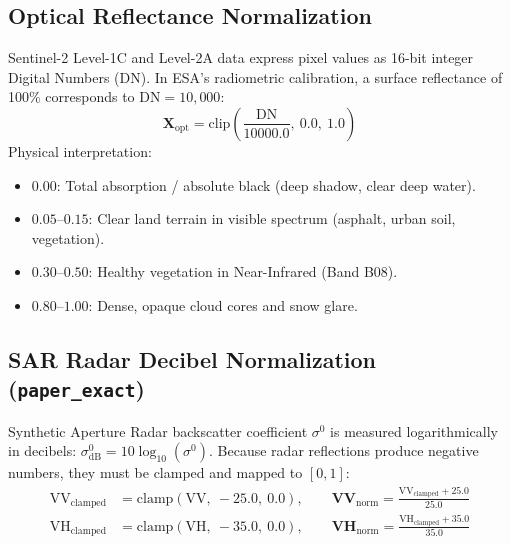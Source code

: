 \documentclass[11pt,a4paper]{article}
\begin{document}
\subsection{Optical Reflectance Normalization}
Sentinel-2 Level-1C and Level-2A data express pixel values as 16-bit integer Digital Numbers ($\text{DN}$). In ESA's radiometric calibration, a surface reflectance of 100\% corresponds to $\text{DN} = 10,000$:
\begin{equation}
\mathbf{X}_{\text{opt}} = \text{clip}\left(\frac{\text{DN}}{10000.0},\ 0.0,\ 1.0\right)
\end{equation}
Physical interpretation:
\begin{itemize}[leftmargin=1.5em]
    \item $0.00$: Total absorption / absolute black (deep shadow, clear deep water).
    \item $0.05\text{--}0.15$: Clear land terrain in visible spectrum (asphalt, urban soil, vegetation).
    \item $0.30\text{--}0.50$: Healthy vegetation in Near-Infrared (Band B08).
    \item $0.80\text{--}1.00$: Dense, opaque cloud cores and snow glare.
\end{itemize}

\subsection{SAR Radar Decibel Normalization (\texttt{paper\_exact})}
Synthetic Aperture Radar backscatter coefficient $\sigma^0$ is measured logarithmically in decibels: $\sigma^0_{\text{dB}} = 10 \log_{10}(\sigma^0)$. Because radar reflections produce negative numbers, they must be clamped and mapped to $[0, 1]$:
\begin{align}
\text{VV}_{\text{clamped}} &= \text{clamp}(\text{VV},\ -25.0,\ 0.0), \qquad 
\mathbf{VV}_{\text{norm}} = \frac{\text{VV}_{\text{clamped}} + 25.0}{25.0} \\[0.4em]
\text{VH}_{\text{clamped}} &= \text{clamp}(\text{VH},\ -35.0,\ 0.0), \qquad 
\mathbf{VH}_{\text{norm}} = \frac{\text{VH}_{\text{clamped}} + 35.0}{35.0}
\end{align}
\end{document}
